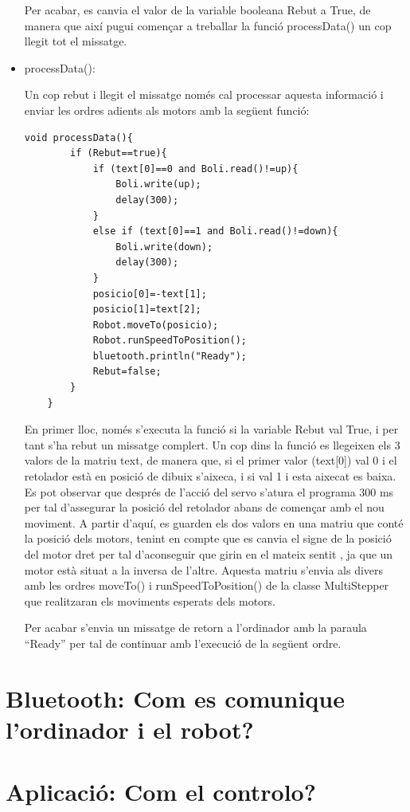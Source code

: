 \begin{itemize}
	Per acabar, es canvia el valor de la variable booleana Rebut a True, de manera que així pugui començar a treballar la funció processData() un cop llegit tot el missatge. 
	
	\item processData():
	
	Un cop rebut i llegit el missatge només cal processar aquesta informació i enviar les ordres adients als motors amb la següent funció:
	
	\begin{lstlisting}[style=Arduino]
	void processData(){
		if (Rebut==true){
			if (text[0]==0 and Boli.read()!=up){
				Boli.write(up);
				delay(300);
			}
			else if (text[0]==1 and Boli.read()!=down){
				Boli.write(down);
				delay(300);
			}
			posicio[0]=-text[1];
			posicio[1]=text[2];
			Robot.moveTo(posicio);
			Robot.runSpeedToPosition();
			bluetooth.println("Ready");
			Rebut=false; 
		}
	}
	\end{lstlisting}
	
	En primer lloc, només s’executa la funció si la variable Rebut val True, i per tant s’ha rebut un missatge complert. Un cop dins la funció es llegeixen els 3 valors de la matriu text, de manera que, si el primer valor (text[0]) val 0 i el retolador està en posició de dibuix s’aixeca, i si val 1 i esta aixecat es baixa. Es pot observar que després de l’acció del servo s’atura el programa 300 ms per tal d’assegurar la posició del retolador abans de començar amb el nou moviment. A partir d’aquí, es guarden els dos valors en una matriu que conté la posició dels motors, tenint en compte que es canvia el signe de la posició del motor dret per tal d’aconseguir que girin en el mateix sentit , ja que un motor està situat a la inversa de l’altre. Aquesta matriu s’envia als divers amb les ordres moveTo() i runSpeedToPosition() de la classe MultiStepper que realitzaran els moviments esperats dels motors. 
	
	Per acabar s’envia un missatge de retorn a l’ordinador amb la paraula “Ready” per tal de continuar amb l’execució de la següent ordre. 
	
	
\end{itemize}

\section{Bluetooth: Com es comunique l'ordinador i el robot?}

\section{Aplicació: Com el controlo?}


